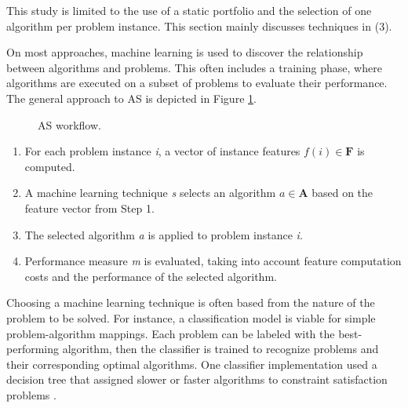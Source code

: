 This study is limited to the use of a static portfolio and the selection of one algorithm per problem instance. This section mainly discusses techniques in (3). 

On most approaches, machine learning is used to discover the relationship between algorithms and problems.  This often includes a training phase, where algorithms are executed on a subset of problems to evaluate their performance. The general approach to AS \citep{bischl2016aslib} is depicted in Figure \ref{fig:asworkflow}.

\begin{figure}[H]
	\centering
	\caption[AS workflow]{AS workflow.}
	\label{fig:asworkflow}
\end{figure}

\begin{enumerate}
	\item For each problem instance \textit{i}, a vector of instance features $f(i) \in \mathbf{F}$ is computed. 
	\item A machine learning technique \textit{s} selects an algorithm $a \in \mathbf{A}$ based on the feature vector from Step 1.
	\item The selected algorithm \textit{a} is applied to problem instance \textit{i}.
	\item Performance measure \textit{m} is evaluated, taking into account feature computation costs and the performance of the selected algorithm.
\end{enumerate}

Choosing a machine learning technique is often based from the nature of the problem to be solved. For instance, a classification model is viable for simple problem-algorithm mappings. Each problem can be labeled with the best-performing algorithm, then the classifier is trained to recognize problems and their corresponding optimal algorithms. One classifier implementation used a decision tree that assigned slower or faster algorithms to constraint satisfaction problems \citep{gent2010learning}. 

